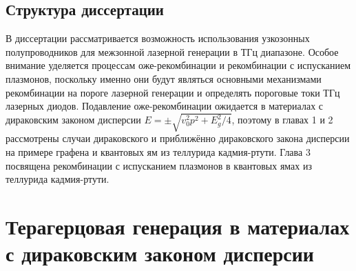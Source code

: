 \section*{Структура диссертации}
В диссертации рассматривается возможность использования узкозонных полупроводников для межзонной лазерной генерации в ТГц диапазоне. Особое внимание уделяется процессам оже-рекомбинации и рекомбинации с испусканием плазмонов, поскольку именно они будут являться основными механизмами рекомбинации на пороге лазерной генерации и определять пороговые токи ТГц лазерных диодов. Подавление оже-рекомбинации ожидается в материалах с дираковским законом дисперсии $E = \pm\sqrt{v_0^2 p^2 + E_g^2/4}$, поэтому в главах 1 и 2 рассмотрены случаи дираковского и приближённо дираковского закона дисперсии на примере графена и квантовых ям из теллурида кадмия-ртути. Глава 3 посвящена рекомбинации с испусканием плазмонов в квантовых ямах из теллурида кадмия-ртути.

\chapter{Терагерцовая генерация в материалах с дираковским законом дисперсии} \label{chapter:graphene}
